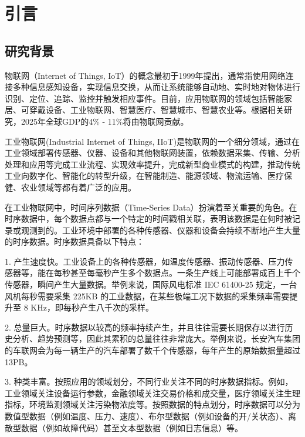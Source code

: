 
\chapter{引言}


\section{研究背景}\label{1-background}


物联网（Internet of Things, IoT）的概念最初于1999年提出，通常指使用网络连接多种信息感知设备，实现信息交换，从而让系统能够自动地、实时地对物体进行识别、定位、追踪、监控并触发相应事件\cite{王保云2009物联网技术研究综述木}。目前，应用物联网的领域包括智能家居、可穿戴设备、工业物联网、智慧医疗、智慧城市、智慧农业等。根据相关研究，2025年全球GDP的4\% - 11\%将由物联网贡献\cite{mouha2021internet}。

工业物联网(Industrial Internet of Things, IIoT)\cite{sisinni2018industrial}是物联网的一个细分领域，通过在工业领域部署传感器、仪器、设备和其他物联网装置，依赖数据采集、传输、分析处理和应用等完成工业流程、实现效率提升，完成新型商业模式的构建，推动传统工业向数字化、智能化的转型升级，在智能制造、能源领域、物流运输、医疗保健、农业领域等都有着广泛的应用。

在工业物联网中，时间序列数据（Time-Series Data）\cite{dunning2015tsdb}扮演着至关重要的角色。在时序数据中，每个数据点都与一个特定的时间戳相关联，表明该数据是在何时被记录或观测到的。工业环境中部署的各种传感器、仪器和设备会持续不断地产生大量的时序数据。时序数据具备以下特点：

1. 产生速度快。工业设备上的各种传感器，如温度传感器、振动传感器、压力传感器等，能在每秒甚至每毫秒产生多个数据点。一条生产线上可能部署成百上千个传感器，瞬间产生大量数据。举例来说，国际风电标准 IEC 61400-25 规定，一台风机每秒需要采集 225KB 的工业数据，在某些极端工况下数据的采集频率需要提升至 8 KHz\cite{PZKX202005001}，即每秒产生八千次的采样。

2. 总量巨大。时序数据以较高的频率持续产生，并且往往需要长期保存以进行历史分析、趋势预测等，因此其累积的总量往往非常庞大。举例来说，长安汽车集团的车联网会为每一辆生产的汽车部署了数千个传感器，每年产生的原始数据量超过13PB。

3. 种类丰富。按照应用的领域划分，不同行业关注不同的时序数据指标。例如，工业领域关注设备运行参数，金融领域关注交易价格和成交量，医疗领域关注生理指标，环境监测领域关注污染物浓度等。按照数据的特点划分，时序数据可以分为数值型数据（例如温度、压力、速度）、布尔型数据（例如设备的开/关状态）、离散型数据（例如故障代码）甚至文本型数据（例如日志信息）等。

